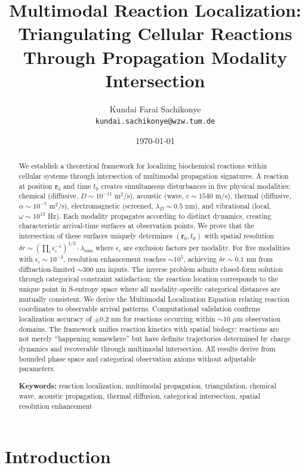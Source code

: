 \documentclass[11pt,a4paper]{article}
\title{\textbf{Multimodal Reaction Localization: \\Triangulating Cellular Reactions Through Propagation Modality Intersection}}
\author{
    Kundai Farai Sachikonye\\
    \texttt{kundai.sachikonye@wzw.tum.de}
}
\date{\today}
\theoremstyle{remark}
\newcommand{\rxnpos}{\mathbf{r}_0}
\newcommand{\rxntime}{t_0}
\begin{document}
\maketitle

\begin{abstract}
We establish a theoretical framework for localizing biochemical reactions within cellular systems through intersection of multimodal propagation signatures. A reaction at position $\rxnpos$ and time $\rxntime$ creates simultaneous disturbances in five physical modalities: chemical (diffusive, $D \sim 10^{-11}$ m$^2$/s), acoustic (wave, $c \sim 1540$ m/s), thermal (diffusive, $\alpha \sim 10^{-7}$ m$^2$/s), electromagnetic (screened, $\lambda_D \sim 0.5$ nm), and vibrational (local, $\omega \sim 10^{13}$ Hz). Each modality propagates according to distinct dynamics, creating characteristic arrival-time surfaces at observation points. We prove that the intersection of these surfaces uniquely determines $(\rxnpos, \rxntime)$ with spatial resolution $\delta r \sim (\prod_i \epsilon_i^{-1})^{1/3} \cdot \lambda_{\min}$ where $\epsilon_i$ are exclusion factors per modality. For five modalities with $\epsilon_i \sim 10^{-3}$, resolution enhancement reaches $\sim 10^5$, achieving $\delta r \sim 0.1$ nm from diffraction-limited $\sim 300$ nm inputs. The inverse problem admits closed-form solution through categorical constraint satisfaction: the reaction location corresponds to the unique point in S-entropy space where all modality-specific categorical distances are mutually consistent. We derive the Multimodal Localization Equation relating reaction coordinates to observable arrival patterns. Computational validation confirms localization accuracy of $\pm 0.2$ nm for reactions occurring within $\sim 10$ $\mu$m observation domains. The framework unifies reaction kinetics with spatial biology: reactions are not merely ``happening somewhere'' but have definite trajectories determined by charge dynamics and recoverable through multimodal intersection. All results derive from bounded phase space and categorical observation axioms without adjustable parameters.

\textbf{Keywords:} reaction localization, multimodal propagation, triangulation, chemical wave, acoustic propagation, thermal diffusion, categorical intersection, spatial resolution enhancement
\end{abstract}

\tableofcontents
\newpage

\section{Introduction}
\end{document}
